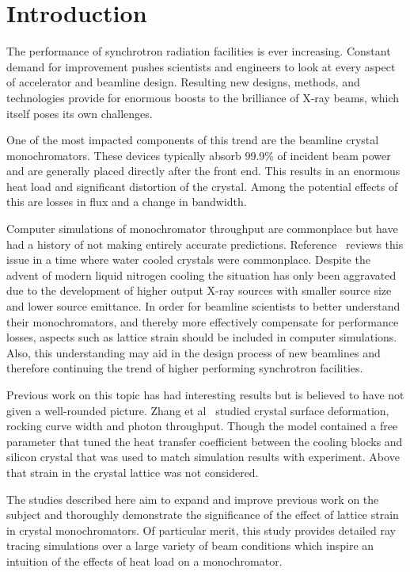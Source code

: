 \documentclass{iucr}
\begin{document}
\section{Introduction}

The performance of synchrotron radiation facilities is ever increasing. Constant demand for improvement pushes scientists and engineers to look at every aspect of accelerator and beamline design. Resulting new designs, methods, and technologies provide for enormous boosts to the brilliance of X-ray beams, which itself poses its own challenges.

One of the most impacted components of this trend are the beamline crystal monochromators. These devices typically absorb 99.9\% of incident beam power~\cite{willmott} and are generally placed directly after the front end. This results in an enormous heat load and significant distortion of the crystal. Among the potential effects of this are losses in flux and a change in bandwidth.

Computer simulations of monochromator throughput are commonplace but have had a history of not making entirely accurate predictions. Reference~\cite{innacuratepredictions} reviews this issue in a time where water cooled crystals were commonplace. Despite the advent of modern liquid nitrogen cooling the situation has only been aggravated due to the development of higher output X-ray sources with smaller source size and lower source emittance. In order for beamline scientists to better understand their monochromators, and thereby more effectively compensate for performance losses, aspects such as lattice strain should be included in computer simulations. Also, this understanding may aid in the design process of new beamlines and therefore continuing the trend of higher performing synchrotron facilities.

Previous work on this topic has had interesting results but is believed to have not given a well-rounded picture. Zhang et al~\cite{Zhang} studied crystal surface deformation, rocking curve width and photon throughput. Though the model contained a free parameter that tuned the heat transfer coefficient between the cooling blocks and silicon crystal that was used to match simulation results with experiment. Above that strain in the crystal lattice was not considered. %

The studies described here aim to expand and improve previous work on the subject and thoroughly demonstrate the significance of the effect of lattice strain in crystal monochromators. Of particular merit, this study provides detailed ray tracing simulations over a large variety of beam conditions which inspire an intuition of the effects of heat load on a monochromator.
\end{document}
